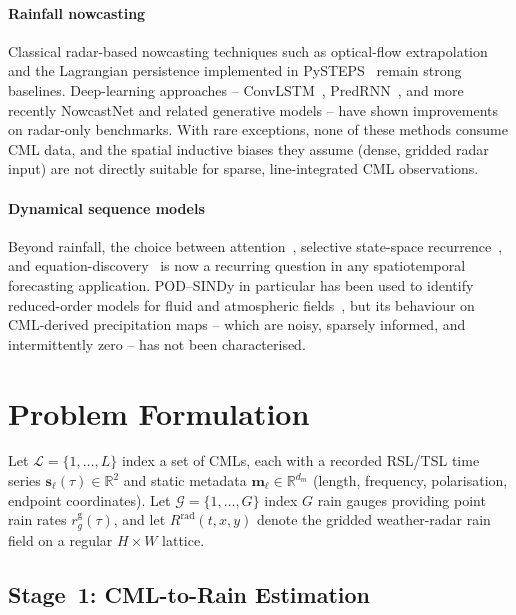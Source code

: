 \documentclass[conference]{IEEEtran}
\begin{document}
\paragraph*{Rainfall nowcasting}
Classical radar-based nowcasting techniques such as optical-flow
extrapolation and the Lagrangian persistence implemented in
PySTEPS~\cite{pulkkinen2019pysteps} remain strong baselines.
Deep-learning approaches -- ConvLSTM~\cite{shi2015convlstm},
PredRNN~\cite{wang2017predrnn}, and more recently NowcastNet and related
generative models -- have shown improvements on radar-only benchmarks.
With rare exceptions, none of these methods consume CML data, and the
spatial inductive biases they assume (dense, gridded radar input) are
not directly suitable for sparse, line-integrated CML observations.

\paragraph*{Dynamical sequence models}
Beyond rainfall, the choice between attention~\cite{vaswani2017},
selective state-space recurrence~\cite{gu2023mamba}, and
equation-discovery~\cite{brunton2016sindy,kaiser2018sindyc} is now a
recurring question in any spatiotemporal forecasting application.
POD--SINDy in particular has been used to identify reduced-order models
for fluid and atmospheric fields~\cite{loiseau2018sindyfluid}, but its
behaviour on CML-derived precipitation maps -- which are noisy,
sparsely informed, and intermittently zero -- has not been characterised.

\section{Problem Formulation}
\label{sec:problem}

Let $\mathcal{L}=\{1,\dots,L\}$ index a set of CMLs, each with a
recorded RSL/TSL time series $\mathbf{s}_\ell(\tau)\in\mathbb{R}^{2}$
and static metadata $\mathbf{m}_\ell\in\mathbb{R}^{d_m}$ (length,
frequency, polarisation, endpoint coordinates). Let
$\mathcal{G}=\{1,\dots,G\}$ index $G$ rain gauges providing point rain
rates $r^{\mathrm{g}}_g(\tau)$, and let $R^{\mathrm{rad}}(t,x,y)$ denote
the gridded weather-radar rain field on a regular $H\times W$ lattice.

\subsection{Stage~1: CML-to-Rain Estimation}
\end{document}
